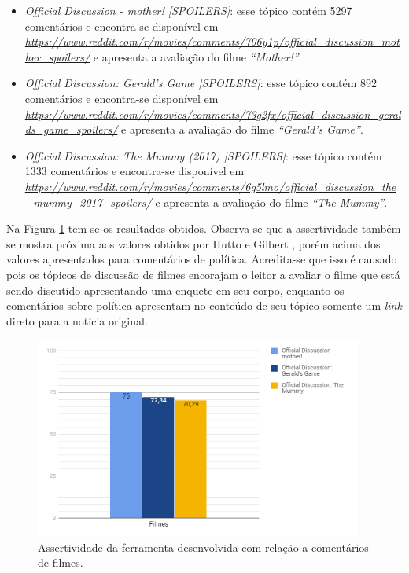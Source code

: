 \begin{itemize}
  \item
  \textit{Official Discussion - mother! [SPOILERS]}: esse tópico contém 5297
  comentários e encontra-se disponível em
  \textit{\url{https://www.reddit.com/r/movies/comments/706y1p/official_discussion_mother_spoilers/}}
  e apresenta a avaliação do filme \textit{``Mother!''}.
  \item
  \textit{Official Discussion: Gerald's Game [SPOILERS]}: esse tópico contém 892
  comentários e
  encontra-se disponível em
  \textit{\url{https://www.reddit.com/r/movies/comments/73g2fx/official_discussion_geralds_game_spoilers/}}
  e apresenta a avaliação do filme \textit{``Gerald's Game''}.
    \item
  \textit{Official Discussion: The Mummy (2017) [SPOILERS]}: esse tópico contém
  1333 comentários e
  encontra-se disponível em
  \textit{\url{https://www.reddit.com/r/movies/comments/6g5lmo/official_discussion_the_mummy_2017_spoilers/}}
  e apresenta a avaliação do filme \textit{``The Mummy''}.
  
\end{itemize}


Na Figura \ref{fig:fil1} tem-se os resultados obtidos. Observa-se que a
assertividade também se mostra próxima aos valores obtidos por Hutto e Gilbert
\cite{conf/icwsm/HuttoG14}, porém acima dos valores apresentados para
comentários de política. Acredita-se que isso é causado pois os
tópicos de discussão de filmes encorajam o leitor a avaliar o filme que está sendo discutido apresentando uma enquete em seu corpo, enquanto
os comentários sobre política apresentam no conteúdo de seu tópico somente um
\textit{link} direto para a notícia original. 


\newpage 


\begin{figure}[!htbp]
\centering
\includegraphics[height=250px]{imagens/filmes1.png}
\caption{Assertividade da ferramenta desenvolvida com relação a comentários de
filmes.}
\label{fig:fil1}
\end{figure}



